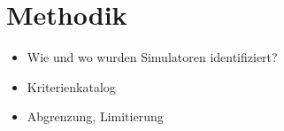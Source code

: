 \chapter{Methodik}

\begin{itemize}
    \item Wie und wo wurden Simulatoren identifiziert?
    \item Kriterienkatalog
    \item Abgrenzung, Limitierung
\end{itemize}
